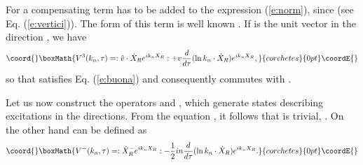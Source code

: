 \documentclass[a4paper,aps,prd,twocolumn,groupedaddress]{revtex4}
\begin{document}
For \coordHE{} a compensating term has to be added to the expression
(\ref{e:norm}), since \coordHE{} (see
Eq. (\ref{e:vertici})). The form of this term is well known \cite{br}. If
\coordHE{} is the unit vector in the direction \coordHE{}, we have
\begin{displaymath}\coord{}\boxMath{
V^3(k_n,\tau) = :\hat{v}\cdot\dot{X}_R e^{ik_nX_R}: +
v\frac{d}{d\tau}(\ln k_n\cdot \dot{X}_R)e^{ik_nX_R},
}{corchetes}{0pt}\coordE{}\end{displaymath}
so that \coordHE{} satisfies Eq. (\ref{e:buona}) and consequently 
\coordHE{}
commutes with \coordHE{}. 

Let us now construct the operators \coordHE{} and \coordHE{}, which generate
states describing excitations in the \myHighlight{${\pm}$}\coordHE{} directions. From the
equation \coordHE{}, it follows that
\coordHE{} is trivial, \coordHE{}.  On the other hand \coordHE{} can be defined
as
\begin{displaymath}\coord{}\boxMath{
V^-(k_n,\tau) = :\dot{X}^-_R e^{ik_nX_R}: -\frac{1}{2}i n
\frac{d}{d\tau}(\ln k_n\cdot \dot{X}_R)e^{ik_nX_R}.
}{corchetes}{0pt}\coordE{}\end{displaymath}
\end{document}
